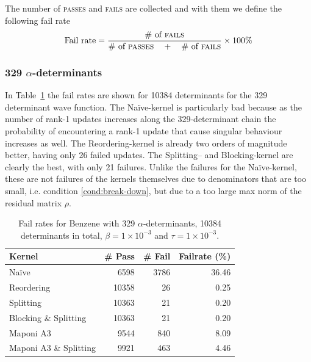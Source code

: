 \documentclass[11pt]{article}
\numberwithin{figure}{section}
\numberwithin{table}{section}
\begin{document}
				The number of \textsc{passes} and \textsc{fails} are collected and with them we define the following fail rate
				\begin{align}
					\text{Fail rate} = \frac{\text{\# of }\textsc{fails}}{\text{\# of }\textsc{passes}\quad+\quad\text{\# of }\textsc{fails}}\times100\%
				\end{align}
				
				\subsubsection{329 $\alpha$-determinants}
				In Table~\ref{tab:fr329} the fail rates are shown for 10384 determinants for the 329 determinant wave function. The Na\"{i}ve-kernel is particularly bad because as the number of rank-1 updates increases along the 329-determinant chain the probability of encountering a rank-1 update that cause singular behaviour increases as well. The Reordering-kernel is already two orders of magnitude better, having only 26 failed updates. The Splitting-- and Blocking-kernel are clearly the best, with only 21 failures. Unlike the failures for the Na\"{i}ve-kernel, these are not failures of the kernels themselves due to denominators that are too small, i.e. condition \ref{cond:break-down}, but due to a too large max norm of the residual matrix $\rho$.\\
\begin{table}[h]
	\centering
		\begin{tabular}{@{}lrrr@{}}
			\toprule
			Kernel   & \# Pass & \# Fail & Failrate (\%) \\ \midrule
			Na\"{i}ve    & 6598     	&  3786           &    36.46      \\
			Reordering    & 10358 		& 26              &    0.25      \\
			Splitting    & 10363 		&  21           &      0.20    \\
			Blocking \& Splitting    & 10363  	& 21              &   0.20       \\
			Maponi A3  & 9544 	&  840            &  8.09        \\
			Maponi A3 \& Splitting & 9921   &  463           &   4.46       \\ \bottomrule
		\end{tabular}
		\caption{Fail rates for Benzene with 329 $\alpha$-determinants, 10384 determinants in total, $\beta=1\times10^{-3}$ and $\tau=1\times10^{-3}$.}
		\label{tab:fr329}
\end{table}
				
\end{document}
